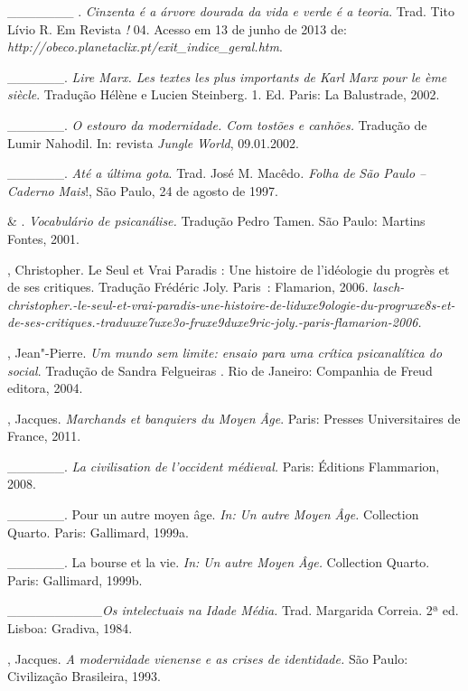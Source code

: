 {\begin{Parskip}
\_\_\_\_\_\_\_ . \emph{Cinzenta é a árvore dourada da vida e verde é a
teoria}. Trad. Tito Lívio R. Em Revista \emph{!} 04. Acesso em 13 de
junho de 2013 de:
\emph{http://obeco.planetaclix.pt/exit\_indice\_geral.htm}.

\_\_\_\_\_\_. \emph{Lire Marx. Les textes les plus importants de Karl
Marx pour le ème siècle}. Tradução Hélène e Lucien Steinberg.
1. Ed. Paris: La Balustrade, 2002.

\_\_\_\_\_\_. \emph{O estouro da modernidade. Com tostões e canhões.}
Tradução de Lumir Nahodil. In: revista \emph{Jungle} \emph{World},
09.01.2002.

\_\_\_\_\_\_. \emph{Até a última gota}. Trad. José M. Macêdo\emph{.
Folha} \emph{de} \emph{São} \emph{Paulo -- Caderno} \emph{Mais}!, São
Paulo, 24 de agosto de 1997.

 \& . \emph{Vocabulário de psicanálise.} Tradução
Pedro Tamen. São Paulo: Martins Fontes, 2001.

, Christopher. Le Seul et Vrai Paradis : Une histoire de
l'idéologie du progrès et de ses critiques. Tradução Frédéric Joly.
Paris~: Flamarion,
2006. \emph{lasch-christopher.-le-seul-et-vrai-paradis-une-histoire-de-liduxe9ologie-du-progruxe8s-et-de-ses-critiques.-traduuxe7uxe3o-fruxe9duxe9ric-joly.-paris-flamarion-2006.}

, Jean"-Pierre. \emph{Um mundo sem limite: ensaio para uma
crítica psicanalítica do social}. Tradução de Sandra Felgueiras .
Rio de Janeiro: Companhia de Freud editora, 2004.

, Jacques. \emph{Marchands et banquiers du Moyen Âge}. Paris:
Presses Universitaires de France, 2011.

\_\_\_\_\_\_. \emph{La civilisation de l'occident médieval.} Paris:
Éditions Flammarion, 2008.

\_\_\_\_\_\_. Pour un autre moyen âge. \emph{In:} \emph{Un autre Moyen
Âge.} Collection Quarto. Paris: Gallimard, 1999a.

\_\_\_\_\_\_. La bourse et la vie. \emph{In:} \emph{Un autre Moyen
Âge.} Collection Quarto. Paris: Gallimard, 1999b.

\_\_\_\_\_\_\_\_\_\_\emph{Os intelectuais na Idade Média.} Trad.
Margarida Correia. 2ª ed. Lisboa: Gradiva, 1984.

, Jacques. \emph{A modernidade vienense e as crises de
identidade.} São Paulo: Civilização Brasileira, 1993.


\end{Parskip}}
